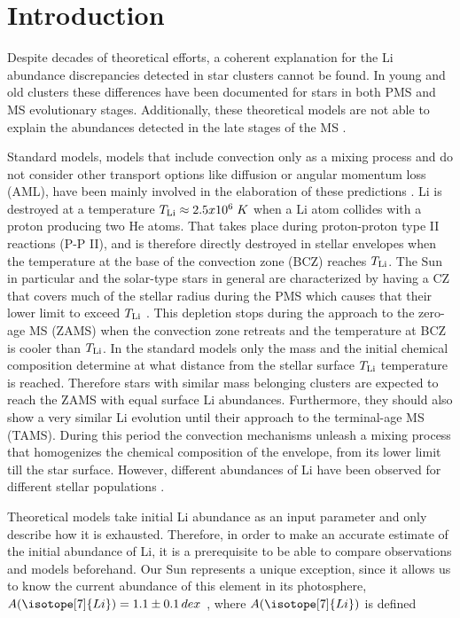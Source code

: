 \documentclass[fleqn,usenatbib]{mnras}
\begin{document}


\section{Introduction} \label{sec_intro}
Despite decades of theoretical efforts, a coherent explanation for the Li abundance discrepancies detected in star clusters cannot be found. In young and old clusters these differences have been documented for stars in both PMS and MS  evolutionary stages. Additionally, these theoretical models are not able to explain the abundances detected in the late stages of the MS \citep{Tschape2001}.\par

Standard models, models that include convection only as a mixing process and do not consider other transport options like diffusion or angular momentum loss (AML), have been mainly involved in the elaboration of these predictions \citep{Sestito2005}. Li is destroyed at a temperature $T_{\mathrm{Li}} \approx 2.5 x 10^6\; K$ when a Li atom collides with a proton producing two He atoms. That takes place during proton-proton type II reactions (P-P II), and is therefore directly destroyed in stellar envelopes when the temperature at the base of the convection zone (BCZ) reaches  $T_{\mathrm{Li}}$. The Sun in particular and the solar-type stars in general are characterized by having a CZ that covers much of the stellar radius during the PMS which causes that their lower limit to exceed $T_{\mathrm{Li}}$ \citep{Iben1965}. This depletion stops during the approach to the zero-age MS (ZAMS) when the convection zone retreats and the temperature at BCZ is cooler than $T_{\mathrm{Li}}$. In the standard models only the mass and the initial chemical composition determine at what distance from the stellar surface $T_{\mathrm{Li}}$ temperature is reached. Therefore stars with similar mass belonging clusters are expected to reach the ZAMS with equal surface Li abundances. Furthermore, they should also show a very similar Li evolution until their approach to the terminal-age MS (TAMS). During this period the convection mechanisms unleash a mixing process that homogenizes the chemical composition of the envelope, from its lower limit till the star surface. However, different abundances of Li have been observed for different stellar populations \citep[see][and references therein]{Somers2014}.\par

Theoretical models take initial Li abundance as an input parameter and only describe how it is exhausted. Therefore, in order to make an accurate estimate of the initial abundance of Li, it is a prerequisite to be able to compare observations and models beforehand. Our Sun represents a unique exception, since it allows us to know the current abundance of this element in its photosphere, $A(\isotope[7]{Li}) = 1.1 \pm 0.1 \, dex$ \citep{Jeffries2004}, where $A(\isotope[7]{Li})$ is defined
\end{document}
